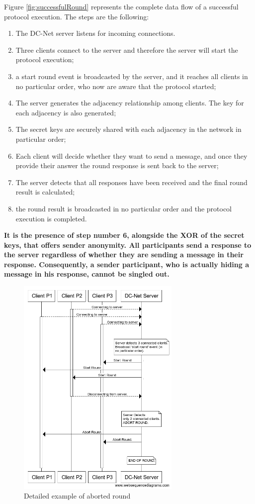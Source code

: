 Figure \ref{fig:successfulRound} represents the complete data flow of a successful protocol execution. The steps are the following:
\begin{enumerate}
    \item The DC-Net server listens for incoming connections.
    \item Three clients connect to the server and therefore the server will start the protocol execution;
    \item a start round event is broadcasted by the server, and it reaches all clients in no particular order, who now are aware that the protocol started;
    \item The server generates the adjacency relationship among clients. The key for each adjacency is also generated;
    \item The secret keys are securely shared with each adjacency in the network in particular order;
    \item Each client will decide whether they want to send a message, and once they provide their answer the round response is sent back to the server;
    \item The server detects that all responses have been received and the final round result is calculated;
    \item the round result is broadcasted in no particular order and the protocol execution is completed.
\end{enumerate}

\textbf{It is the presence of step number 6, alongside the XOR of the secret keys, that offers sender anonymity. All participants send a response to the server regardless of whether they are sending a message in their response. Consequently, a sender participant, who is actually hiding a message in his response, cannot be singled out.}

\begin{figure}[H]
    \centering
    \includegraphics[width=0.7\textwidth]{Images/Design/abortedRound.png}
    \caption{Detailed example of aborted round}
    \label{fig:abortedRound}
\end{figure}

